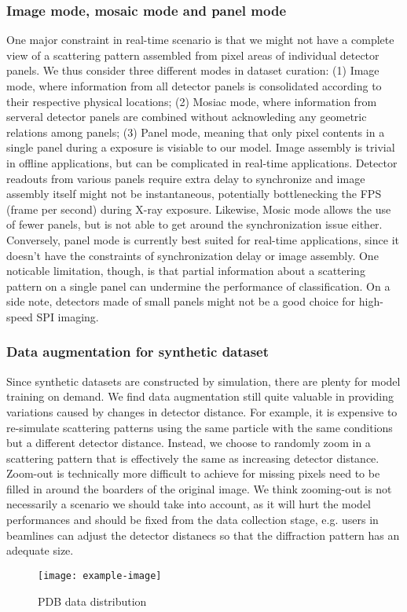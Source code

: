 \subsubsection{Image mode, mosaic mode and panel mode}

One major constraint in real-time scenario is that we might not have a complete
view of a scattering pattern assembled from pixel areas of individual detector
panels.  We thus consider three different modes in dataset curation: (1) Image
mode, where information from all detector panels is consolidated according to
their respective physical locations; (2) Mosiac mode, where information from
serveral detector panels are combined without acknowleding any geometric
relations among panels;  (3) Panel mode, meaning that only pixel contents in a
single panel during a exposure is visiable to our model.  Image assembly is
trivial in offline applications, but can be complicated in real-time
applications.  Detector readouts from various panels require extra delay to
synchronize and image assembly itself might not be instantaneous, potentially
bottlenecking the FPS (frame per second) during X-ray exposure. Likewise, Mosic
mode allows the use of fewer panels, but is not able to get around the
synchronization issue either.  Conversely, panel mode is currently best suited
for real-time applications, since it doesn't have the constraints of
synchronization delay or image assembly.  One noticable limitation, though, is
that partial information about a scattering pattern on a single panel can
undermine the performance of classification.  On a side note, detectors made of
small panels might not be a good choice for high-speed SPI imaging.  


\subsubsection{Data augmentation for synthetic dataset}


Since synthetic datasets are constructed by simulation, there are plenty for
model training on demand.  We find data augmentation still quite valuable in
providing variations caused by changes in detector distance.  For example, it is
expensive to re-simulate scattering patterns using the same particle with the
same conditions but a different detector distance.  Instead, we choose to
randomly zoom in a scattering pattern that is effectively the same as increasing
detector distance.  Zoom-out is technically more difficult to achieve for
missing pixels need to be filled in around the boarders of the original image.
We think zooming-out is not necessarily a scenario we should take into account,
as it will hurt the model performances and should be fixed from the data
collection stage, e.g. users in beamlines can adjust the detector distanecs so
that the diffraction pattern has an adequate size.  

\begin{figure}
\caption{PDB data distribution}
\texttt{[image: example-image]}
\label{fig:pdb_data_distribution}
\end{figure}